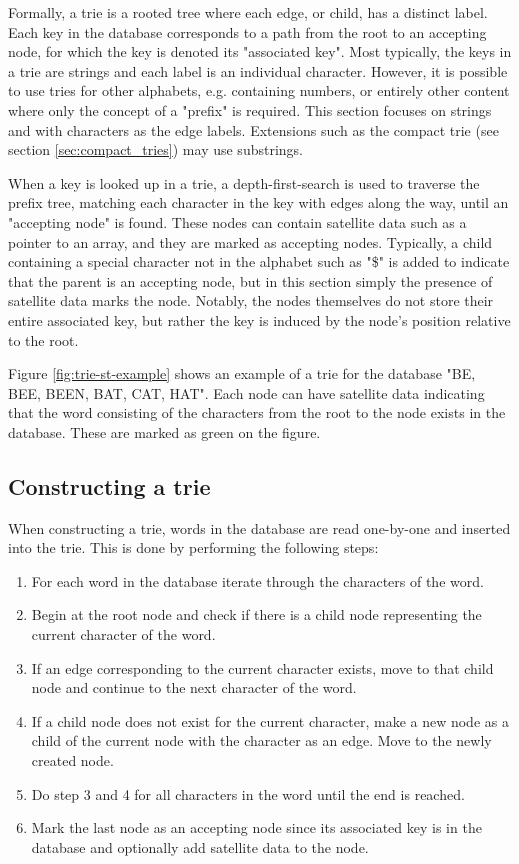 Formally, a trie is a rooted tree where each edge, or child, has a distinct label. Each key in the database corresponds to a path from the root to an accepting node, for which the key is denoted its "associated key". Most typically, the keys in a trie are strings and each label is an individual character. However, it is possible to use tries for other alphabets, e.g. containing numbers, or entirely other content where only the concept of a "prefix" is required. This section focuses on strings and with characters as the edge labels. Extensions such as the compact trie (see section \ref{sec:compact_tries}) may use substrings. 

When a key is looked up in a trie, a depth-first-search is used to traverse the prefix tree, matching each character in the key with edges along the way, until an "accepting node" is found. These nodes can contain satellite data such as a pointer to an array, and they are marked as accepting nodes. Typically, a child containing a special character not in the alphabet such as "\$" is added to indicate that the parent is an accepting node, but in this section simply the presence of satellite data marks the node. Notably, the nodes themselves do not store their entire associated key, but rather the key is induced by the node's position relative to the root. 

Figure \ref{fig:trie-st-example} shows an example of a trie for the database "BE, BEE, BEEN, BAT, CAT, HAT". Each node can have satellite data indicating that the word consisting of the characters from the root to the node exists in the database. These are marked as green on the figure. 

\subsection{Constructing a trie} \label{sec:Constructiontire}

When constructing a trie, words in the database are read one-by-one and inserted into the trie. This is done by performing the following steps:

\begin{enumerate}
  \item For each word in the database iterate through the characters of the word.
  \item Begin at the root node and check if there is a child node representing the current character of the word. 
  \item If an edge corresponding to the current character exists, move to that child node and continue to the next character of the word.
  \item If a child node does not exist for the current character, make a new node as a child of the current node with the character as an edge. Move to the newly created node.
  \item Do step 3 and 4 for all characters in the word until the end is reached. 
  \item Mark the last node as an accepting node since its associated key is in the database and optionally add satellite data to the node. 
\end{enumerate}

